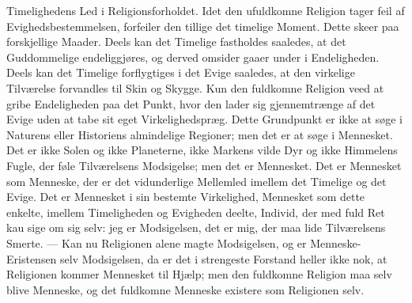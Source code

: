 \documentclass[12pt,a4paper]{book}
\begin{document}
Timelighedens Led i Religionsforholdet. Idet den ufuldkomne Religion tager feil af
Evighedsbestemmelsen, forfeiler den tillige det timelige Moment. Dette skeer paa
forskjellige Maader. Deels kan det Timelige fastholdes saaledes, at det Guddommelige
endeliggjøres, og derved omsider gaaer under i Endeligheden. Deels kan det Timelige
forflygtiges i det Evige saaledes, at den virkelige Tilværelse forvandles til Skin og
Skygge. Kun den fuldkomne Religion veed at gribe Endeligheden paa det Punkt, hvor den
lader sig gjennemtrænge af det Evige uden at tabe sit eget Virkelighedspræg. Dette
Grundpunkt er ikke at søge i Naturens eller Historiens almindelige Regioner; men det er
at søge i Mennesket. Det er ikke Solen og ikke Planeterne, ikke Markens vilde Dyr og
ikke Himmelens Fugle, der føle Tilværelsens Modsigelse; men det er Mennesket. Det er
Mennesket som Menneske, der er det vidunderlige Mellemled imellem det Timelige og det
Evige. Det er Mennesket i sin bestemte Virkelighed, Mennesket som dette enkelte,
imellem Timeligheden og Evigheden deelte, Individ, der med fuld Ret kau sige om sig
selv: jeg er Modsigelsen, det er mig, der maa lide Tilværelsens Smerte. --- Kan nu
Religionen alene magte Modsigelsen, og er Menneske-Eristensen selv Modsigelsen, da er
det i strengeste Forstand heller ikke nok, at Religionen kommer Mennesket til Hjælp;
men den fuldkomne Religion maa selv blive Menneske, og det fuldkomne Menneske existere
som Religionen selv.
\end{document}
